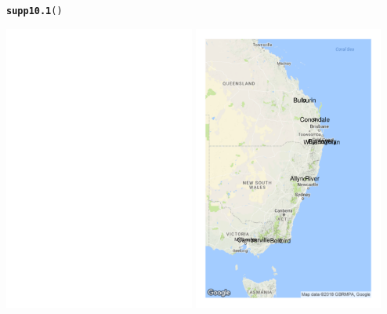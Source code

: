 \documentclass[12pt, a4paper,  BCOR=8.25mm, DIV=15]{scrartcl}\usepackage[]{graphicx}\usepackage[]{color}
\makeatletter
\newcommand{\hlstd}[1]{\textcolor[rgb]{0.345,0.345,0.345}{#1}}%
\newcommand{\hlkwd}[1]{\textcolor[rgb]{0.737,0.353,0.396}{\textbf{#1}}}%
\newenvironment{kframe}{%
 \def\at@end@of@kframe{}%
 \ifinner\ifhmode%
  \def\at@end@of@kframe{\end{minipage}}%
  \begin{minipage}{\columnwidth}%
 \fi\fi%
 \def\FrameCommand##1{\hskip\@totalleftmargin \hskip-\fboxsep
 \colorbox{shadecolor}{##1}\hskip-\fboxsep
     \hskip-\linewidth \hskip-\@totalleftmargin \hskip\columnwidth}%
 \MakeFramed {\advance\hsize-\width
   \@totalleftmargin\z@ \linewidth\hsize
   \@setminipage}}%
 {\par\unskip\endMakeFramed%
 \at@end@of@kframe}
\newenvironment{knitrout}{}{} %
\makeatother
\begin{document}
\begin{suppfigure}
\begin{knitrout}
\color{fgcolor}\begin{kframe}
\begin{alltt}
\hlkwd{supp10.1}\hlstd{()}
\end{alltt}
\end{kframe}

{\centering \includegraphics[width=0.47\textwidth]{figs/map-google-possums-10_1-1} 
\includegraphics[width=0.47\textwidth]{figs/map-google-possums-10_1-2} 

}



\end{knitrout}
\end{suppfigure}
\end{document}
